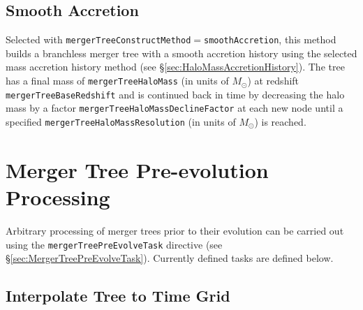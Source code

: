\subsection{Smooth Accretion}\label{sec:SmoothAccretion}

Selected with {\tt mergerTreeConstructMethod}$=${\tt smoothAccretion}, this method builds a branchless merger tree with a smooth accretion history using the selected mass accretion history method (see \S\ref{sec:HaloMassAccretionHistory}). The tree has a final mass of {\tt mergerTreeHaloMass} (in units of $M_\odot$) at redshift {\tt mergerTreeBaseRedshift} and is continued back in time by decreasing the halo mass by a factor {\tt mergerTreeHaloMassDeclineFactor} at each new \gls{node} until a specified {\tt mergerTreeHaloMassResolution} (in units of $M_\odot$) is reached.

\section{Merger Tree Pre-evolution Processing}

Arbitrary processing of merger trees prior to their evolution can be carried out using the {\tt mergerTreePreEvolveTask} directive (see \S\ref{sec:MergerTreePreEvolveTask}). Currently defined tasks are defined below.

\subsection{Interpolate Tree to Time Grid}

